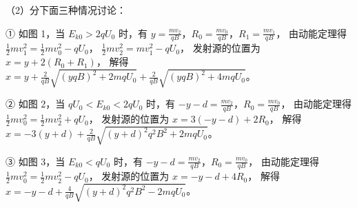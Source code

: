 \documentclass[\gkver]{gaokaozhenti}
\begin{document}
\begin{enumerate}
{（2）分下面三种情况讨论：

① 如图 1，当 $E_{k0} > 2qU_{0}$ 时，有
$y = \frac{mv_{2}}{qB}$，$R_{0} = \frac{mv_{0}}{qB}$，$R_{1} = \frac{mv_{1}}{qB}$，
由动能定理得
$\frac{1}{2}mv_{1}^{2} = \frac{1}{2}mv_{0}^{2} - qU_{0}$，
$\frac{1}{2}mv_{2}^{2} = mv_{1}^{2} - qU_{0}$，
发射源的位置为
$x = y + 2(R_{0} + R_{1})$，
解得
$x = y + \frac{2}{qB}\sqrt{(yqB)^{2} + 2mqU_{0}} + \frac{2}{qB}\sqrt{(yqB)^{2} + 4mqU_{0}}$。


② 如图 2，当 $qU_{0} < E_{k0} < 2qU_{0}$ 时，有
$-y - d = \frac{mv_{2}}{qB}$，$R_{0} = \frac{mv_{0}}{qB}$，
由动能定理得
$\frac{1}{2}mv_{0}^{2} = \frac{1}{2}mv_{2}^{2} + qU_{0}$，
发射源的位置为
$x = 3(-y - d) + 2R_{0}$，
解得 $x = -3(y + d) + \frac{2}{qB}\sqrt{(y + d)^{2}q^{2}B^{2} + 2mqU_{0}}$。


③ 如图 3，当 $E_{k0} < qU_{0}$ 时，有
$-y - d = \frac{mv_{2}}{qB}$，$R_{0} = \frac{mv_{0}}{qB}$，
由动能定理得
$\frac{1}{2}mv_{0}^{2} = \frac{1}{2}mv_{2}^{2} - qU_{0}$，
发射源的位置为
$x = -y - d + 4R_{0}$，
解得
$x = -y - d + \frac{4}{qB}\sqrt{(y + d)^{2}q^{2}B^{2} - 2mqU_{0}}$。

}

\end{enumerate}
\end{document}
